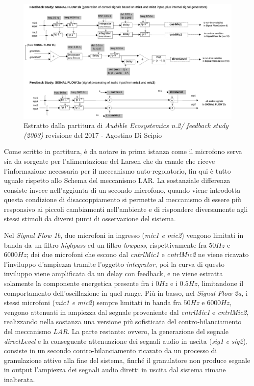\begin{figure}[h!]
\begin{center}
\includegraphics[width=14cm]{figures/LARFeedbackstudy2017.pdf}
\caption{Estratto dalla partitura di \textit{Audible Ecosystemics n.2/ feedback study (2003)}
revisione del 2017 - Agostino Di Scipio}
\vspace{0.5cm}
\end{center}
\end{figure}

Come scritto in partitura, è da notare in prima istanza
come il microfono serva sia da sorgente per l'alimentazione del Larsen che
da canale che riceve l'informazione necessaria per il meccanismo auto-regolatorio,
fin qui è tutto uguale rispetto allo Schema del meccanismo LAR.
La sostanziale differenza consiste invece nell'aggiunta di un secondo microfono,
quando viene introdotta questa condizione di disaccoppiamento si 
permette al meccanismo di essere più responsivo ai piccoli cambiamenti nell'ambiente
e di rispondere diversamente agli stessi stimoli da diversi punti di osservazione del sistema.

Nel \emph{Signal Flow 1b}, due microfoni in ingresso (\emph{mic1 e mic2}) 
vengono limitati in banda da un filtro \emph{highpass} ed 
un filtro \emph{lowpass}, rispettivamente fra $50Hz$ e $6000Hz$; dei due microfoni che escono 
dal \emph{cntrlMic1} e \emph{cntrlMic2} ne viene ricavato l'inviluppo d'ampiezza tramite
l'oggetto \emph{integrator}, poi la curva di questo inviluppo viene amplificata da 
un delay con feedback, e ne viene estratta solamente la componente energetica 
presente fra i $0Hz$ e i $0.5Hz$, limitandone il comportamento dell'oscillazione in quel range.
Più in basso, nel \emph{Signal Flow 2a}, i stessi microfoni (\emph{mic1 e mic2}) sempre
limitati in banda fra $50Hz$ e $6000Hz$, vengono attenuati in ampiezza dal segnale
proveniente dal \emph{cntrlMic1} e \emph{cntrlMic2}, realizzando nella sostanza una 
versione più sofisticata del contro-bilanciamento del meccanismo \emph{LAR}.
La parte restante: ovvero, la generazione del segnale \emph{directLevel} e la 
conseguente attenuazione dei segnali audio in uscita (\emph{sig1 e sig2}),
consiste in un secondo contro-bilanciamento ricavato da un processo di granulazione
attivo alla fine del sistema, finché il granulatore non produce segnale in output 
l'ampiezza dei segnali audio diretti in uscita dal sistema rimane inalterata.

